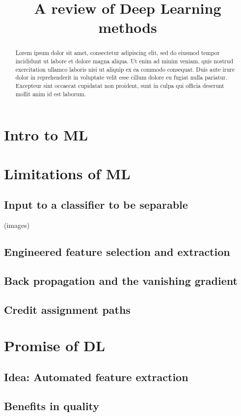 \documentclass[]{article}
\title{A review of Deep Learning methods}
\author{}
\begin{document}
\maketitle

\begin{abstract}
Lorem ipsum dolor sit amet, consectetur adipiscing elit, sed do eiusmod tempor incididunt ut labore et dolore magna aliqua. Ut enim ad minim veniam, quis nostrud exercitation ullamco laboris nisi ut aliquip ex ea commodo consequat. Duis aute irure dolor in reprehenderit in voluptate velit esse cillum dolore eu fugiat nulla pariatur. Excepteur sint occaecat cupidatat non proident, sunt in culpa qui officia deserunt mollit anim id est laborum.
\end{abstract}

\section{Intro to ML}

\section{Limitations of ML}
\subsection{ Input to a classifier to be separable }
(images)
\subsection{Engineered feature selection and extraction}
\subsection{Back propagation and  the vanishing gradient}
\subsection{Credit assignment paths}
\section{Promise of DL}
\subsection{Idea: Automated feature extraction}
\subsection{Benefits in quality}
\end{document}
